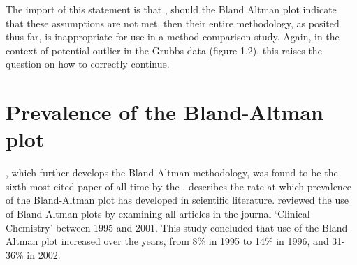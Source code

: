 \documentclass[12pt, a4paper]{report}
\theoremstyle{plain}
\theoremstyle{definition}
\theoremstyle{remark}
\begin{document}
The import of this statement is that , should the Bland Altman
plot indicate that these assumptions are not met, then their
entire methodology, as posited thus far, is inappropriate for use
in a method comparison study. Again, in the context of potential
outlier in the Grubbs data (figure 1.2), this raises the question
on how to correctly continue.


















\section{Prevalence of the Bland-Altman plot}

\citet*{BA86}, which further develops the Bland-Altman methodology,
was found to be the sixth most cited paper of all time by the
\citet{BAcite}. \cite{Dewitte} describes the rate at which
	prevalence of the Bland-Altman plot has developed in scientific
	literature. \citet{Dewitte} reviewed the use of Bland-Altman plots
	by examining all articles in the journal `Clinical Chemistry'
	between 1995 and 2001. This study concluded that use of the
	Bland-Altman plot increased over the years, from 8\% in 1995 to
	14\% in 1996, and 31-36\% in 2002.
	
\end{document}
